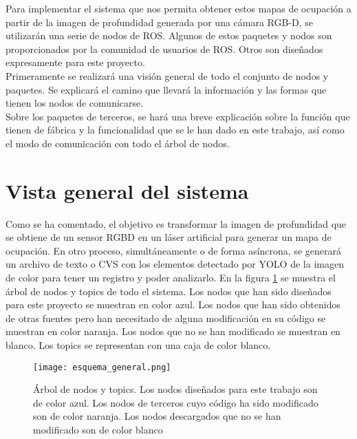 Para implementar el sistema que nos permita obtener estos mapas de ocupación a partir de la imagen de profundidad generada por una cámara RGB-D, se utilizarán una serie de nodos de ROS. Algunos de estos paquetes y nodos son proporcionados por la comunidad de usuarios de ROS. Otros son diseñados expresamente para este proyecto.\\

Primeramente se realizará una visión general de todo el conjunto de nodos y paquetes. Se explicará el camino que llevará la información y las formas que tienen los nodos de comunicarse.\\

Sobre los paquetes de terceros, se hará una breve explicación sobre la función que tienen de fábrica y la funcionalidad que se le han dado en este trabajo, así como el modo de comunicación con todo el árbol de nodos.\\

\section{Vista general del sistema}

Como se ha comentado, el objetivo es transformar la imagen de profundidad que se obtiene de un sensor RGBD en un láser artificial para generar un mapa de ocupación. En otro proceso, simultáneamente o de forma asíncrona, se generará un archivo de texto o CVS con los elementos detectado por YOLO de la imagen de color para tener un registro y poder analizarlo. En la figura \ref{fig:esq_general} se muestra el árbol de nodos y topics de todo el sistema. Los nodos que han sido diseñados para este proyecto se muestran en color azul. Los nodos que han sido obtenidos de otras fuentes pero han necesitado de alguna modificación en su código se muestran en color naranja. Los nodos que no se han modificado se muestran en blanco. Los topics se representan con una caja de color blanco.\\

\begin{figure}[h]
	\begin{center} 
		\texttt{[image: esquema\_general.png]}
	\end{center}
	\caption{Árbol de nodos y topics. Los nodos diseñados para este trabajo son de color azul. Los nodos de terceros cuyo código ha sido modificado son de color naranja. Los nodos descargados que no se han modificado son de color blanco}
	\label{fig:esq_general}
\end{figure}

